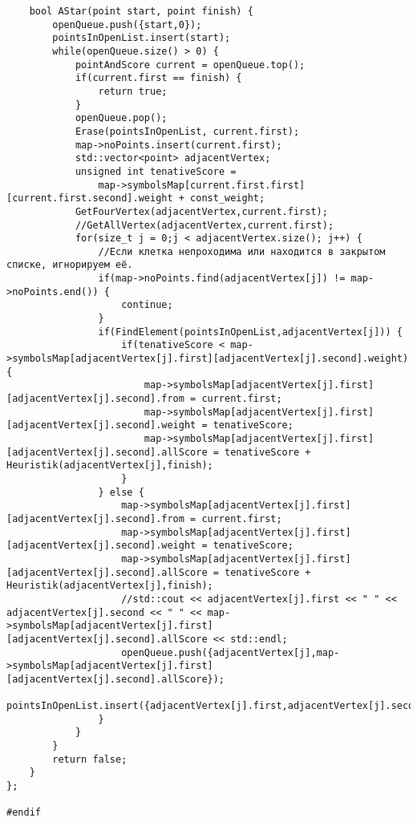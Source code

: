 \documentclass[12pt]{article}
\begin{document}
\begin{verbatim}
    bool AStar(point start, point finish) {
        openQueue.push({start,0});
        pointsInOpenList.insert(start);
        while(openQueue.size() > 0) {
            pointAndScore current = openQueue.top();
            if(current.first == finish) {
                return true;
            }
            openQueue.pop();
            Erase(pointsInOpenList, current.first);
            map->noPoints.insert(current.first);
            std::vector<point> adjacentVertex;
            unsigned int tenativeScore = 
                map->symbolsMap[current.first.first][current.first.second].weight + const_weight;
            GetFourVertex(adjacentVertex,current.first);
            //GetAllVertex(adjacentVertex,current.first);
            for(size_t j = 0;j < adjacentVertex.size(); j++) {
                //Если клетка непроходима или находится в закрытом списке, игнорируем её.
                if(map->noPoints.find(adjacentVertex[j]) != map->noPoints.end()) {
                    continue;
                }
                if(FindElement(pointsInOpenList,adjacentVertex[j])) {
                    if(tenativeScore < map->symbolsMap[adjacentVertex[j].first][adjacentVertex[j].second].weight) {
                        map->symbolsMap[adjacentVertex[j].first][adjacentVertex[j].second].from = current.first;
                        map->symbolsMap[adjacentVertex[j].first][adjacentVertex[j].second].weight = tenativeScore;
                        map->symbolsMap[adjacentVertex[j].first][adjacentVertex[j].second].allScore = tenativeScore + Heuristik(adjacentVertex[j],finish); 
                    }
                } else {
                    map->symbolsMap[adjacentVertex[j].first][adjacentVertex[j].second].from = current.first;
                    map->symbolsMap[adjacentVertex[j].first][adjacentVertex[j].second].weight = tenativeScore;
                    map->symbolsMap[adjacentVertex[j].first][adjacentVertex[j].second].allScore = tenativeScore + Heuristik(adjacentVertex[j],finish);
                    //std::cout << adjacentVertex[j].first << " " << adjacentVertex[j].second << " " << map->symbolsMap[adjacentVertex[j].first][adjacentVertex[j].second].allScore << std::endl;
                    openQueue.push({adjacentVertex[j],map->symbolsMap[adjacentVertex[j].first][adjacentVertex[j].second].allScore});
                    pointsInOpenList.insert({adjacentVertex[j].first,adjacentVertex[j].second});
                }
            }
        }
        return false; 
    }
};

#endif
\end{verbatim}
\end{document}
